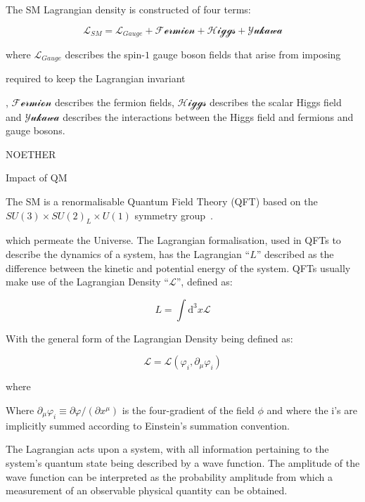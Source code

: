 The SM Lagrangian density is constructed of four terms:

\begin{equation}
\mathcal{L}_{SM} = \mathcal{L}_{Gauge} + \mathcal{Fermion} + \mathcal{Higgs} + \mathcal{Yukawa}
\end{equation}

where $\mathcal{L}_{Gauge}$ describes the spin-$1$ gauge boson fields that arise from imposing 

required to keep the Lagrangian invariant


, $\mathcal{Fermion}$ describes the fermion fields, $\mathcal{Higgs}$ describes the scalar Higgs field and $\mathcal{Yukawa}$ describes the interactions between the Higgs field and fermions and gauge bosons.

NOETHER

Impact of QM

The SM is a renormalisable Quantum Field Theory (QFT) based on the $SU(3)\times SU(2)_{L} \times U(1)$ symmetry group~\cite{LagrangiansSM}.


 which permeate the Universe. 
The Lagrangian formalisation, used in QFTs to describe the dynamics of a system, has the Lagrangian ``$L$'' described as the difference between the kinetic and potential energy of the system\cite{LagrangiansSM}. 
QFTs usually make use of the Lagrangian Density ``$\mathcal{L}$'', defined as\cite{QFT}:

\begin{equation}
L = \int \mathrm{d^{3}}x \mathcal{L}
\end{equation}

With the general form of the Lagrangian Density being defined as:

\begin{equation}
\mathcal{L} = \mathcal{L} ( \varphi_{i}, \partial _{\mu} \varphi_{i} )
\end{equation}


where 


Where $\partial _{\mu}\varphi_{i} \equiv \partial \varphi / (\partial x^{\mu} )$ is the four-gradient of the field $\phi$ and where the i's are implicitly summed according to Einstein's summation convention\cite{ElectroweakStrong}.

The Lagrangian acts upon a system, with all information pertaining to the system's quantum state being described by a wave function. 
The amplitude of the wave function can be interpreted as the probability amplitude from which a measurement of an observable physical quantity can be obtained\cite{Isham}. 

